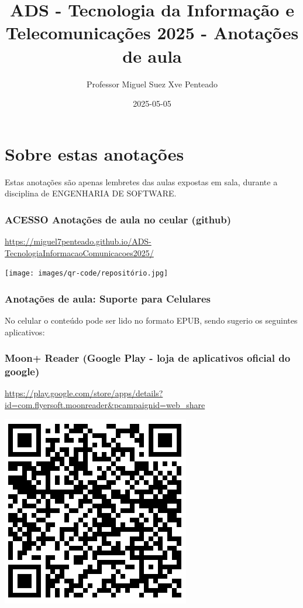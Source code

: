 \documentclass[
]{book}
\title{ADS - Tecnologia da Informação e Telecomunicações 2025 - Anotações de aula}
\author{Professor Miguel Suez Xve Penteado}
\date{2025-05-05}
\begin{document}
\maketitle

{
\setcounter{tocdepth}{1}
\tableofcontents
}
\chapter*{Sobre estas anotações}\label{sobre-estas-anotauxe7uxf5es}

Estas anotações são apenas lembretes das aulas expostas em sala, durante a disciplina de ENGENHARIA DE SOFTWARE.

\subsection{ACESSO Anotações de aula no ceular (github)}\label{acesso-anotauxe7uxf5es-de-aula-no-ceular-github}

\url{https://miguel7penteado.github.io/ADS-TecnologiaInformacaoComunicacoes2025/}

\texttt{[image: images/qr-code/repositório.jpg]}

\subsection{Anotações de aula: Suporte para Celulares}\label{anotauxe7uxf5es-de-aula-suporte-para-celulares}

No celular o conteúdo pode ser lido no formato EPUB, sendo sugerio os seguintes aplicativos:

\subsection{\texorpdfstring{\textbf{Moon+ Reader (Google Play - loja de aplicativos oficial do google)}}{Moon+ Reader (Google Play - loja de aplicativos oficial do google)}}\label{moon-reader-google-play---loja-de-aplicativos-oficial-do-google}

\url{https://play.google.com/store/apps/details?id=com.flyersoft.moonreader&pcampaignid=web_share}

\includegraphics{images/qr-code/leitor_ebook/MoonReaderPlus.jpg}
\end{document}
